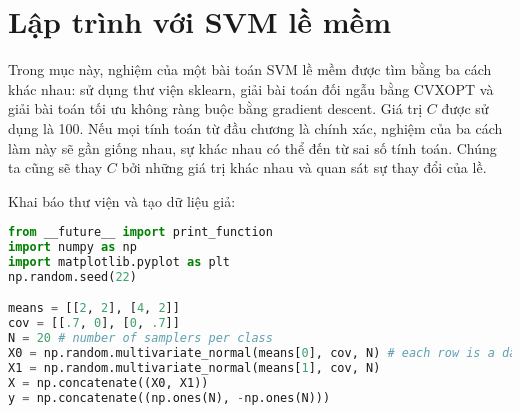


\section{Lập trình với SVM lề mềm}
Trong mục này, nghiệm của một bài toán SVM lề mềm được tìm bằng ba cách khác nhau: sử dụng thư viện sklearn, giải bài toán đối ngẫu
bằng CVXOPT và giải bài toán tối ưu không ràng buộc bằng gradient
descent. Giá trị $C$ được sử dụng là 100.
Nếu mọi tính toán từ đầu chương là chính xác, nghiệm của ba cách làm này sẽ
gần giống nhau, sự khác nhau có thể đến từ sai số tính toán.
Chúng ta cũng sẽ thay $C$ bởi những giá trị khác nhau và quan sát sự thay đổi của lề.



Khai báo thư viện và tạo dữ liệu giả:

\begin{lstlisting}[language=Python]
from __future__ import print_function
import numpy as np
import matplotlib.pyplot as plt
np.random.seed(22)

means = [[2, 2], [4, 2]]
cov = [[.7, 0], [0, .7]]
N = 20 # number of samplers per class
X0 = np.random.multivariate_normal(means[0], cov, N) # each row is a data point
X1 = np.random.multivariate_normal(means[1], cov, N)
X = np.concatenate((X0, X1))
y = np.concatenate((np.ones(N), -np.ones(N)))
\end{lstlisting}

